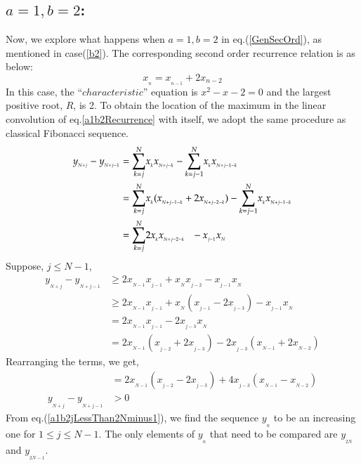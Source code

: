 \begin{multicols}{2}
\section{\underline{$a=1, b = 2$}:}\label{section-17}
Now, we explore what happens when $a=1, b=2$ in eq.(\ref{GenSecOrd}), as mentioned in case(\ref{b2}). The corresponding second order recurrence relation is as below:
\begin{equation}
x_{_n} =  x_{_{n-1}} + 2x_{{n-2}}\label{eq-17.1}
\end{equation}
In this case, the ``$characteristic$'' equation is $x^2 - x - 2 = 0$ and the largest positive root, $R$, is 2. To obtain the location of the maximum in the linear convolution of eq.\ref{a1b2Recurrence} with itself, we adopt the same procedure as classical Fibonacci sequence.
{\fontsize{9}{9}\selectfont\begin{align}
y_{_{N+j}} - y_{_{N+j-1}} &= \displaystyle{\sum_{k=j}^{N}}x_{_{k}}x_{_{N+j-k}} -  \displaystyle{\sum_{k=j-1}^{N}}x_{_k}x_{_{N+j-1-k}}\nonumber\\
&= \displaystyle{\sum_{k=j}^{N}}x_{_{k}}(x_{_{N+j-1-k}}+2x_{_{N+j-2-k}}) -  \displaystyle{\sum_{k=j-1}^{N}}x_{_k}x_{_{N+j-1-k}}\nonumber\\
&= \displaystyle{\sum_{k=j}^{N}}2x_{_{k}}x_{_{N+j-2-k}} \hspace{0.1in}- x_{_{j-1}}x_{_N}\label{eq-17.2}
\end{align}}
Suppose, $j \leq N-1$,
\begin{align}
y_{_{N+j}} - y_{_{N+j-1}}&\geq 2x_{_{N-1}}x_{_{j-1}} + x_{_N}x_{_{j-2}} - x_{_{j-1}}x_{_N}\nonumber\\
&\geq 2x_{_{N-1}}x_{_{j-1}} + x_{_N}(x_{_{j-1}}-2x_{_{j-3}})- x_{_{j-1}}x_{_N}\nonumber\\
&= 2x_{_{N-1}}x_{_{j-1}} - 2x_{_{j-3}}x_{_N}\nonumber\\
&= 2x_{_{N-1}}(x_{_{j-2}}+2x_{_{j-3}}) - 2x_{_{j-3}}(x_{_{N-1}}+2x_{_{N-2}})\nonumber
\end{align}
Rearranging the terms, we get,
\begin{align}
&= 2x_{_{N-1}}(x_{_{j-2}} - 2x_{_{j-3}}) + 4x_{_{j-3}}(x_{_{N-1}} - x_{_{N-2}})\nonumber\\
y_{_{N+j}} - y_{_{N+j-1}}&> 0\label{eq-17.3}
\end{align}
From eq.(\ref{a1b2jLessThan2Nminus1}), we find the sequence $y_{_n}$ to be an increasing one for $1 \leq j \leq N-1$. The only elements of $y_{_n}$ that need to be compared are $y_{_{2N}}$ and $y_{_{2N-1}}$.


\end{multicols}

